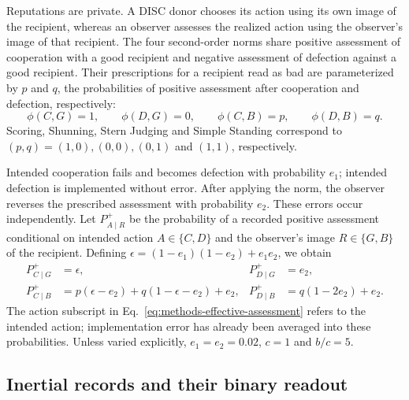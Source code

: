 \documentclass[fleqn,10pt]{article}
\begin{document}
Reputations are private. A DISC donor chooses its action using its own image of the recipient, whereas an observer assesses the realized action using the observer's image of that recipient. The four second-order norms share positive assessment of cooperation with a good recipient and negative assessment of defection against a good recipient. Their prescriptions for a recipient read as bad are parameterized by $p$ and $q$, the probabilities of positive assessment after cooperation and defection, respectively:
\begin{equation}
\phi(C,G)=1,\qquad \phi(D,G)=0,\qquad
\phi(C,B)=p,\qquad \phi(D,B)=q.
\label{eq:methods-norm}
\end{equation}
Scoring, Shunning, Stern Judging and Simple Standing correspond to $(p,q)=(1,0),(0,0),(0,1)$ and $(1,1)$, respectively.

Intended cooperation fails and becomes defection with probability $e_1$; intended defection is implemented without error. After applying the norm, the observer reverses the prescribed assessment with probability $e_2$. These errors occur independently. Let $P^+_{A\mid R}$ be the probability of a recorded positive assessment conditional on intended action $A\in\{C,D\}$ and the observer's image $R\in\{G,B\}$ of the recipient. Defining $\epsilon=(1-e_1)(1-e_2)+e_1e_2$, we obtain
\begin{equation}
\begin{aligned}
P^+_{C\mid G}&=\epsilon,
& P^+_{D\mid G}&=e_2,\\
P^+_{C\mid B}&=p(\epsilon-e_2)+q(1-\epsilon-e_2)+e_2,
& P^+_{D\mid B}&=q(1-2e_2)+e_2.
\end{aligned}
\label{eq:methods-effective-assessment}
\end{equation}
The action subscript in Eq.~\eqref{eq:methods-effective-assessment} refers to the intended action; implementation error has already been averaged into these probabilities. Unless varied explicitly, $e_1=e_2=0.02$, $c=1$ and $b/c=5$.

\subsection*{Inertial records and their binary readout}
\end{document}
